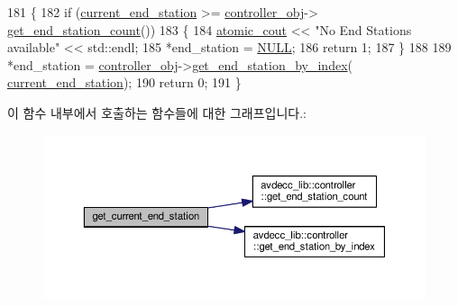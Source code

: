 \begin{DoxyCode}
181 \{
182     \textcolor{keywordflow}{if} (\hyperlink{classcmd__line_a67c43393f654ad7bc5c7caf29634cede}{current\_end\_station} >= \hyperlink{classcmd__line_af0a7784509e5bf1210a2aa19cea5df70}{controller\_obj}->
      \hyperlink{classavdecc__lib_1_1controller_ab5ddf7b4a9718fe3e821289141f44485}{get\_end\_station\_count}())
183     \{
184         \hyperlink{cmd__line_8h_a0bc38ccc65c79ba06c6fcd7b4bf554c3}{atomic\_cout} << \textcolor{stringliteral}{"No End Stations available"} << std::endl;
185         *end\_station = \hyperlink{openavb__types__base__pub_8h_a070d2ce7b6bb7e5c05602aa8c308d0c4}{NULL};
186         \textcolor{keywordflow}{return} 1;
187     \}
188 
189     *end\_station = \hyperlink{classcmd__line_af0a7784509e5bf1210a2aa19cea5df70}{controller\_obj}->\hyperlink{classavdecc__lib_1_1controller_a2a8ec1205ea0d5fdd6f833285257d0d0}{get\_end\_station\_by\_index}(
      \hyperlink{classcmd__line_a67c43393f654ad7bc5c7caf29634cede}{current\_end\_station});
190     \textcolor{keywordflow}{return} 0;
191 \}
\end{DoxyCode}


이 함수 내부에서 호출하는 함수들에 대한 그래프입니다.\+:
\nopagebreak
\begin{figure}[H]
\begin{center}
\leavevmode
\includegraphics[width=350pt]{classcmd__line_aa7ddf8d9fbcf5d1c6c5f329bc850418c_cgraph}
\end{center}
\end{figure}




